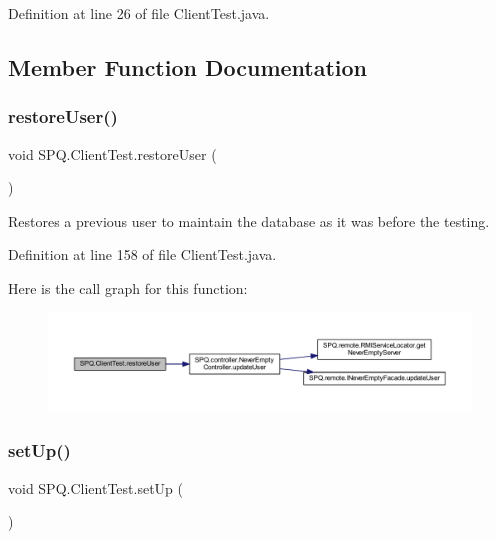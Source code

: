 Definition at line 26 of file Client\+Test.\+java.



\subsection{Member Function Documentation}
\mbox{\label{class_s_p_q_1_1_client_test_acc91cf7e3927e95fc4515abeae043969}} 
\subsubsection{\texorpdfstring{restore\+User()}{restoreUser()}}
{\footnotesize\ttfamily void S\+P\+Q.\+Client\+Test.\+restore\+User (\begin{DoxyParamCaption}{ }\end{DoxyParamCaption})}

Restores a previous user to maintain the database as it was before the testing. 

Definition at line 158 of file Client\+Test.\+java.

Here is the call graph for this function\+:
\nopagebreak
\begin{figure}[H]
\begin{center}
\leavevmode
\includegraphics[width=350pt]{class_s_p_q_1_1_client_test_acc91cf7e3927e95fc4515abeae043969_cgraph}
\end{center}
\end{figure}
\mbox{\label{class_s_p_q_1_1_client_test_abcdab9dbc12c8a65ebbfb96877e4d5a1}} 
\subsubsection{\texorpdfstring{set\+Up()}{setUp()}}
{\footnotesize\ttfamily void S\+P\+Q.\+Client\+Test.\+set\+Up (\begin{DoxyParamCaption}{ }\end{DoxyParamCaption})}

